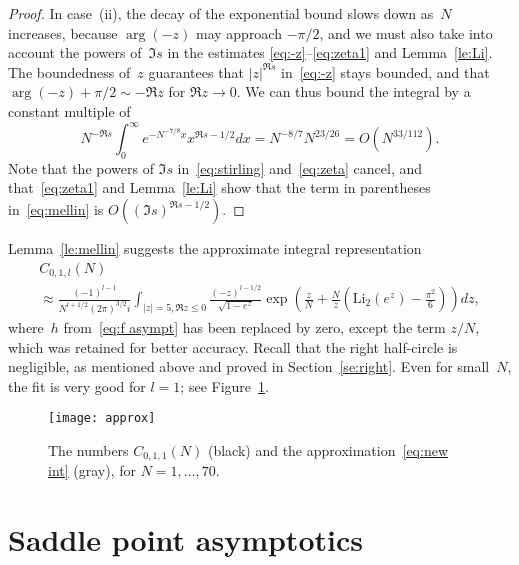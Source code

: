 \documentclass[a4paper]{amsart}
\begin{document}
\begin{proof}
  In case~(ii), the decay of the exponential bound slows down as~$N$ increases,
  because $\arg(-z)$ may approach $-\pi/2$, and we must also take into
  account the powers of~$\Im s$ in the estimates \eqref{eq:-z}--\eqref{eq:zeta1}
  and Lemma~\ref{le:Li}.
  The boundedness of~$z$ guarantees 
  that $|z|^{\Re s}$ in~\eqref{eq:-z} stays bounded,
  and that $\arg(-z) + \pi/2 \sim -\Re z$ for $\Re z\to0$.
  We can thus bound the integral by a constant multiple of
  \[
    N^{-\Re s}\int_0^\infty e^{-N^{-7/8}x} x^{\Re s-1/2}dx=
     N^{-8/7} N^{23/26}=O(N^{33/112}).
  \]
  Note that the powers of $\Im s$ in~\eqref{eq:stirling} and~\eqref{eq:zeta} cancel, and
  that~\eqref{eq:zeta1} and Lemma~\ref{le:Li} show that the term in parentheses
  in~\eqref{eq:mellin} is $O((\Im s)^{\Re s-1/2})$.
\end{proof}

Lemma~\ref{le:mellin} suggests the approximate integral representation
\begin{multline}\label{eq:new int}
  C_{0,1,l}(N) \\ \approx \frac{(-1)^{l-1}}{N^{l+1/2}(2\pi)^{3/2}i}
  \int_{|z|=5, \Re z\leq 0}
  \frac{(-z)^{l-1/2}}{\sqrt{1-e^z}} \exp\left( \frac{z}{N} + \frac{N}{z}
  \left( \mathrm{Li}_2(e^z) - \frac{\pi^2}{6}\right) \right) dz,
\end{multline}
where~$h$ from~\eqref{eq:f asympt} has been replaced by zero,
except the term $z/N$, which was retained for better accuracy.
Recall that the right half-circle is negligible, as mentioned
above and proved in Section~\eqref{se:right}.
Even for small~$N$, the fit is very good for $l=1$; see Figure~\ref{fig:approx}.
%
\begin{figure}
\begin{center}
\texttt{[image: approx]}
\end{center}
\caption{\label{fig:approx}The numbers $C_{0,1,1}(N)$ (black)
and the approximation~\eqref{eq:new int} (gray), for
$N=1,\dots,70$.}
\end{figure}



\section{Saddle point asymptotics}\label{se:saddle}
\end{document}
